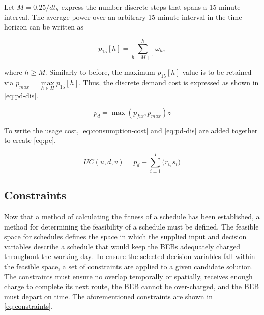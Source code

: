 \documentclass[11pt,a4paper,final]{article}
\newcommand{\UC}{UC(u, d, v)}               %
\begin{document}
Let \(M = 0.25/dt_h\) express the number discrete steps that spans a 15-minute interval. The average power over an
arbitrary 15-minute interval in the time horizon can be written as

\begin{equation}
p_{15}[h] = \sum_{h-M+1}^h \omega_h,
\end{equation}

where \(h \ge M\). Similarly to before, the maximum \(p_{15}[h]\) value is to be retained via \(p_{max} = \max\limits_{h \in
H}p_{15}[h]\). Thus, the discrete demand cost is expressed as shown in \ref{eq:pd-dis}.

\begin{equation}
\label{eq:pd-dis}
  p_d = \max(p_{fix}, p_{max})z
\end{equation}

To write the usage cost, \ref{eq:consumption-cost} and \ref{eq:pd-dis} are added together to create \ref{eq:pc}.

\begin{equation}
\label{eq:pc}
\UC = p_d + \sum_{i=1}^I \Big( r_{v_i}s_i \Big)
\end{equation}

\subsection{Constraints}
\label{sec:constraints}
Now that a method of calculating the fitness of a schedule has been established, a method for determining the
feasibility of a schedule must be defined. The feasible space for schedules defines the space in which the supplied
input and decision variables describe a schedule that would keep the BEBs adequately charged throughout the working day.
To ensure the selected decision variables fall within the feasible space, a set of constraints are applied to a given
candidate solution. The constraints must ensure no overlap temporally or spatially, receives enough charge to complete
its next route, the BEB cannot be over-charged, and the BEB must depart on time. The aforementioned constraints are
shown in \ref{eq:constraints}.
\end{document}
